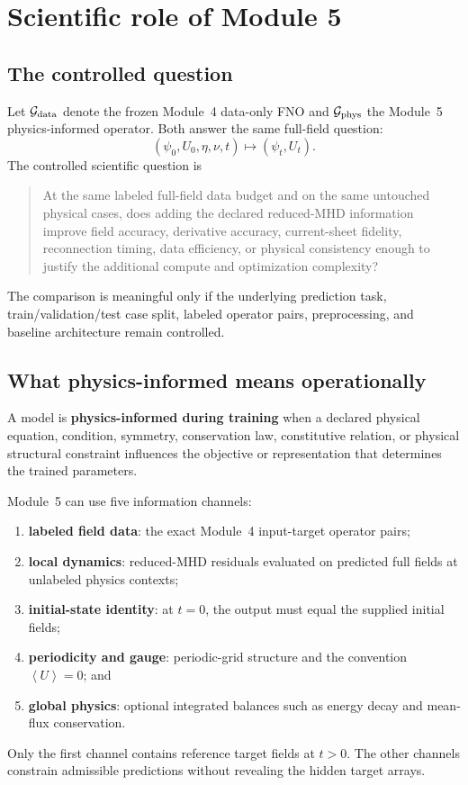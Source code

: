 \documentclass[11pt]{article}
\newcommand{\average}[1]{\left\langle #1\right\rangle}
\begin{document}
\ProjectTOC
\clearpage
{}

\section{Scientific role of Module 5}
\label{sec:role}

\subsection{The controlled question}
Let $\mathcal{G}_{\rm data}$ denote the frozen Module~4 data-only FNO and $\mathcal{G}_{\rm phys}$ the Module~5 physics-informed operator. Both answer the same full-field question:
\begin{equation}
(\psi_0,U_0,\eta,\nu,t)\mapsto(\psi_t,U_t).
\end{equation}
The controlled scientific question is
\begin{quote}
At the same labeled full-field data budget and on the same untouched physical cases, does adding the declared reduced-MHD information improve field accuracy, derivative accuracy, current-sheet fidelity, reconnection timing, data efficiency, or physical consistency enough to justify the additional compute and optimization complexity?
\end{quote}
The comparison is meaningful only if the underlying prediction task, train/validation/test case split, labeled operator pairs, preprocessing, and baseline architecture remain controlled.

\subsection{What physics-informed means operationally}
\begin{definitionbox}
A model is \textbf{physics-informed during training} when a declared physical equation, condition, symmetry, conservation law, constitutive relation, or physical structural constraint influences the objective or representation that determines the trained parameters.
\end{definitionbox}

Module~5 can use five information channels:
\begin{enumerate}[label=\arabic*.]
  \item \textbf{labeled field data}: the exact Module~4 input-target operator pairs;
  \item \textbf{local dynamics}: reduced-MHD residuals evaluated on predicted full fields at unlabeled physics contexts;
  \item \textbf{initial-state identity}: at $t=0$, the output must equal the supplied initial fields;
  \item \textbf{periodicity and gauge}: periodic-grid structure and the convention $\average U=0$; and
  \item \textbf{global physics}: optional integrated balances such as energy decay and mean-flux conservation.
\end{enumerate}
Only the first channel contains reference target fields at $t>0$. The other channels constrain admissible predictions without revealing the hidden target arrays.
\end{document}
